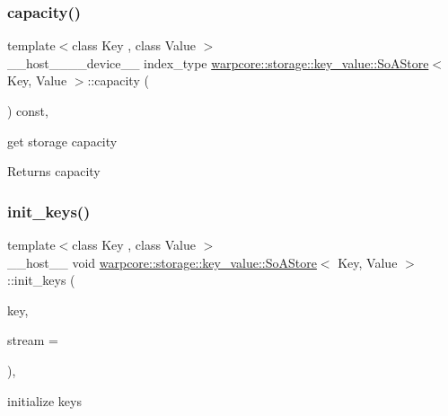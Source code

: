 \subsubsection{\texorpdfstring{capacity()}{capacity()}}
{\footnotesize\ttfamily template$<$class Key , class Value $>$ \\
\+\_\+\+\_\+host\+\_\+\+\_\+\+\_\+\+\_\+device\+\_\+\+\_\+ index\+\_\+type \hyperlink{classwarpcore_1_1storage_1_1key__value_1_1SoAStore}{warpcore\+::storage\+::key\+\_\+value\+::\+So\+A\+Store}$<$ Key, Value $>$\+::capacity (\begin{DoxyParamCaption}{ }\end{DoxyParamCaption}) const\hspace{0.3cm}{\ttfamily [inline]}, {\ttfamily [noexcept]}}



get storage capacity 

\begin{DoxyReturn}{Returns}
capacity 
\end{DoxyReturn}
\mbox{\label{classwarpcore_1_1storage_1_1key__value_1_1SoAStore_a4e2cbadf289a8f38bf81aa7e01190f9f}} 
\subsubsection{\texorpdfstring{init\+\_\+keys()}{init\_keys()}}
{\footnotesize\ttfamily template$<$class Key , class Value $>$ \\
\+\_\+\+\_\+host\+\_\+\+\_\+ void \hyperlink{classwarpcore_1_1storage_1_1key__value_1_1SoAStore}{warpcore\+::storage\+::key\+\_\+value\+::\+So\+A\+Store}$<$ Key, Value $>$\+::init\+\_\+keys (\begin{DoxyParamCaption}\item[{key\+\_\+type}]{key,  }\item[{cuda\+Stream\+\_\+t}]{stream = {} }\end{DoxyParamCaption})\hspace{0.3cm}{\ttfamily [inline]}, {\ttfamily [noexcept]}}



initialize keys 


